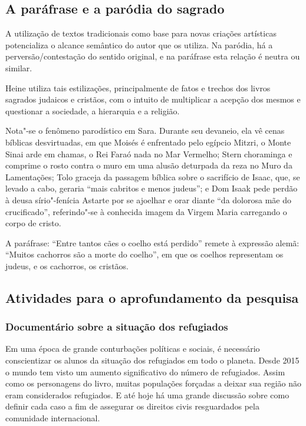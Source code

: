 \documentclass[12pt]{extarticle}
\begin{document}
\subsection{A paráfrase e a paródia do sagrado}

A utilização de textos tradicionais como base para novas criações
artísticas potencializa o alcance semântico do autor que os utiliza. Na
paródia, há a perversão/contestação do sentido original, e na paráfrase
esta relação é neutra ou similar.

Heine utiliza tais estilizações, principalmente de fatos e trechos dos
livros sagrados judaicos e cristãos, com o intuito de multiplicar a
acepção dos mesmos e questionar a sociedade, a hierarquia e a religião.

Nota"-se o fenômeno parodístico em Sara. Durante seu devaneio, ela vê cenas
bíblicas desvirtuadas, em que Moisés é enfrentado pelo egípcio Mitzri, o
Monte Sinai arde em chamas, o Rei Faraó nada no Mar Vermelho; Stern
choraminga e comprime o rosto contra o muro em uma alusão deturpada da
reza no Muro da Lamentações; Tolo graceja da passagem bíblica sobre o
sacrifício de Isaac, que, se levado a cabo, geraria ``mais cabritos e
menos judeus''; e Dom Isaak pede perdão à deusa sírio"-fenícia Astarte
por se ajoelhar e orar diante ``da dolorosa mãe do crucificado'',
referindo"-se à conhecida imagem da Virgem Maria carregando o corpo de
cristo.

A paráfrase: ``Entre tantos cães o coelho está perdido'' remete à
expressão alemã: ``Muitos cachorros são a morte do coelho'', em que os
coelhos representam os judeus, e os cachorros, os cristãos.

\subsection{Atividades para o aprofundamento da pesquisa}

\subsubsection{Documentário sobre a situação dos refugiados}

Em uma época de grande conturbações políticas e sociais, 
é necessário conscientizar os alunos da situação dos refugiados 
em todo o planeta. Desde 2015 o mundo tem visto um aumento 
significativo do número de refugiados. Assim como os personagens 
do livro, muitas populações forçadas a deixar sua região não eram considerados 
refugiados. E até hoje há uma grande discussão sobre como definir
cada caso a fim de assegurar os direitos civis resguardados pela 
comunidade internacional. 
\end{document}

